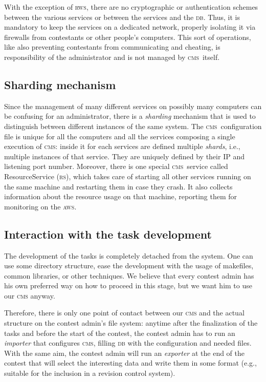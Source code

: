 \documentclass[a4paper,8pt]{amsart}
\newcommand{\CMS}{\textsc{cms}}
\newcommand{\DB}{\textsc{db}}
\newcommand{\RS}{\textsc{rs}}
\newcommand{\AWS}{\textsc{aws}}
\newcommand{\RWS}{\textsc{rws}}
\begin{document}
\begin{multicols}{2}
  With the exception of \RWS, there are no cryptographic or
  authentication schemes between the various services or between the
  services and the \DB. Thus, it is mandatory to keep the services on
  a dedicated network, properly isolating it via firewalls from
  contestants or other people's computers. This sort of operations,
  like also preventing contestants from communicating and cheating, is
  responsibility of the administrator and is not managed by
  \CMS\ itself.

  \subsection{Sharding mechanism}
  \label{ssec:sharding}

  Since the management of many different services on possibly many
  computers can be confusing for an administrator, there is a
  \emph{sharding} mechanism that is used to distinguish between
  different instances of the same system. The \CMS\ configuration file
  is unique for all the computers and all the services composing a
  single execution of \CMS: inside it for each services are defined
  multiple \emph{shards}, i.e., multiple instances of that
  service. They are uniquely defined by their IP and listening port
  number. Moreover, there is one special \CMS\ service called
  ResourceService (\RS), which takes care of starting all other
  services running on the same machine and restarting them in case
  they crash. It also collects information about the resource usage on
  that machine, reporting them for monitoring on the \AWS.

  \subsection{Interaction with the task development}

  The development of the tasks is completely detached from the
  system. One can use some directory structure, ease the development
  with the usage of makefiles, common libraries, or other
  techniques. We believe that every contest admin has his own
  preferred way on how to proceed in this stage, but we want him to
  use our \CMS{} anyway.

  Therefore, there is only one point of contact between our \CMS{} and
  the actual structure on the contest admin's file system: anytime
  after the finalization of the tasks and before the start of the
  contest, the contest admin has to run an \emph{importer\/} that
  configures \CMS{}, filling \DB{} with the configuration and needed
  files. With the same aim, the contest admin will run an
  \emph{exporter\/} at the end of the contest that will select the
  interesting data and write them in some format (e.g., suitable for
  the inclusion in a revision control system).


\end{multicols}
\end{document}
